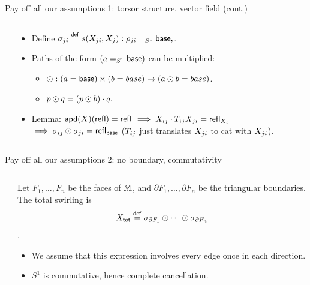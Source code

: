 \begin{frame}{Pay off all our assumptions 1: torsor structure, vector field (cont.)}
\begin{columns}
\begin{column}{0.15\textwidth}

\end{column}
\begin{column}{0.85\textwidth}
\begin{itemize}
\item<2-> Define \( \sigma_{ji}\stackrel{\mathsf{def}}{=} s(X_{ji}, X_j):\rho_{ji}=_{S^1}\mathsf{base}, \).
\item<3-> Paths of the form \( (a=_{S^1}\mathsf{base}) \) can be multiplied: 
\begin{itemize}
\item \( \odot:(a=\mathsf{base})\times (b=base)\to (a\odot b=base) \).
\item \( p\odot q=(p\odot b)\cdot q. \)
\end{itemize}
\item<4-> Lemma: \( \mathsf{apd}(X)(\mathsf{refl})=\mathsf{refl}\) \(\implies X_{ij}\cdot T_{ij}X_{ji}=\mathsf{refl}_{X_i}\) \(\implies\sigma_{ij}\odot\sigma_{ji}=\mathsf{refl}_{\mathsf{base}} \) (\( T_{ij} \) just translates \( X_{ji} \) to cat with \( X_{ji} \)).
\end{itemize}
\end{column}
\end{columns}
\end{frame}

\begin{frame}{Pay off all our assumptions 2: no boundary, commutativity}
\begin{columns}
\begin{column}{0.15\textwidth}

\end{column}
\begin{column}{0.85\textwidth}
\begin{mydef}
Let \( F_1,\ldots,F_n \) be the faces of \( \mathbb{M} \), and \( \partial F_1,\ldots,\partial F_n \) be the triangular boundaries. The \alert{total swirling} is \[ X_{\mathsf{tot}} \stackrel{\mathsf{def}}{=} \sigma_{\partial F_1}\odot\cdots\odot\sigma_{\partial F_n} \].
\end{mydef}
\begin{itemize}
\item<2-> We assume that this expression involves \alert{every edge once in each direction}.
\item<3-> \( S^1 \) is commutative, hence \alert{complete cancellation}.
\end{itemize}
\end{column}
\end{columns}
\end{frame}


